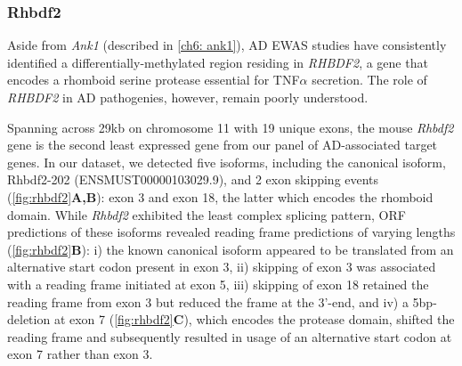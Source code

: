 \newpage
\subsubsection{Rhbdf2}
Aside from \textit{Ank1} (described in \cref{ch6: ank1}), AD EWAS studies have consistently identified a differentially-methylated region residing in \textit{RHBDF2}, a gene that encodes a rhomboid serine protease essential for  TNF$\alpha$ secretion. The role of \textit{RHBDF2} in AD pathogenies, however, remain poorly understood.   

Spanning across 29kb on chromosome 11 with 19 unique exons, the mouse \textit{Rhbdf2} gene is the second least expressed gene from our panel of AD-associated target genes. In our dataset, we detected five isoforms, including the canonical isoform, Rhbdf2-202 (ENSMUST00000103029.9), and 2 exon skipping events (\cref{fig:rhbdf2}\textbf{A,B}): exon 3 and exon 18, the latter which encodes the rhomboid domain. While \textit{Rhbdf2} exhibited the least complex splicing pattern, ORF predictions of these isoforms revealed reading frame predictions of varying lengths (\cref{fig:rhbdf2}\textbf{B}): i) the known canonical isoform appeared to be translated from an alternative start codon present in exon 3, ii) skipping of exon 3 was associated with a reading frame initiated at exon 5, iii) skipping of exon 18 retained the reading frame from exon 3 but reduced the frame at the 3'-end, and iv) a 5bp-deletion at exon 7 (\cref{fig:rhbdf2}\textbf{C}), which encodes the protease domain, shifted the reading frame and subsequently resulted in usage of an alternative start codon at exon 7 rather than exon 3.  


